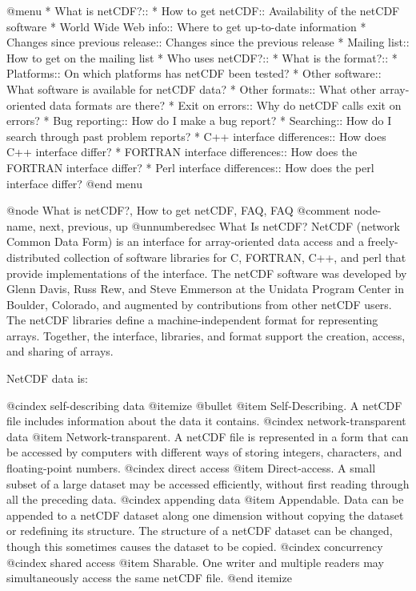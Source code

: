 {@menu
* What is netCDF?::
* How to get netCDF::           Availability of the netCDF software
* World Wide Web info::         Where to get up-to-date information
* Changes since previous release::  Changes since the previous release
* Mailing list::                How to get on the mailing list
* Who uses netCDF?::
* What is the format?::
* Platforms::                   On which platforms has netCDF been tested?
* Other software::              What software is available for netCDF data?
* Other formats::               What other array-oriented data formats are there?
* Exit on errors::              Why do netCDF calls exit on errors?
* Bug reporting::               How do I make a bug report?
* Searching::                   How do I search through past problem reports?
* C++ interface differences::   How does C++ interface differ?
* FORTRAN interface differences::  How does the FORTRAN interface differ?
* Perl interface differences::  How does the perl interface differ?
@end menu

@node What is netCDF?, How to get netCDF, FAQ, FAQ
@comment  node-name,  next,  previous,  up
@unnumberedsec What Is netCDF?
NetCDF (network Common Data Form) is an interface for array-oriented data
access and a freely-distributed collection of software libraries for C,
FORTRAN, C++, and perl that provide implementations of the interface.
The netCDF software was developed by Glenn Davis, Russ Rew, and Steve
Emmerson at the Unidata Program Center in Boulder, Colorado, and
augmented by contributions from other netCDF users.  The netCDF
libraries define a machine-independent format for representing
arrays. Together, the interface, libraries, and format support
the creation, access, and sharing of arrays.

NetCDF data is:

@cindex self-describing data
@itemize @bullet
@item
Self-Describing.  A netCDF file includes information about the
data it contains.
@cindex network-transparent data
@item
Network-transparent.  A netCDF file is represented in a form
that can be accessed by computers with different ways of storing
integers, characters, and floating-point numbers.
@cindex direct access
@item
Direct-access.  A small subset of a large dataset may be
accessed efficiently, without first reading through all the
preceding data.
@cindex appending data
@item
Appendable.  Data can be appended to a netCDF dataset along one
dimension without copying the dataset or redefining its
structure.  The structure of a netCDF dataset can be changed,
though this sometimes causes the dataset to be copied.
@cindex concurrency
@cindex shared access
@item
Sharable.  One writer and multiple readers may simultaneously
access the same netCDF file.
@end itemize

}

